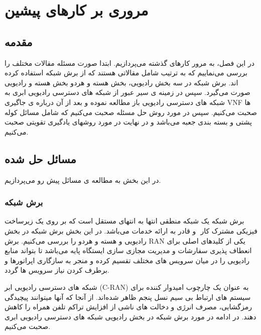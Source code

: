 \chapter{مروری بر کارهای پیشین}

\section{مقدمه}
در این فصل، به مرور کارهای گذشته می‌پردازیم.
ابتدا صورت مسئله مقالات مختلف را بررسی می‌نماییم که
 به ترتیب شامل مقالاتی هستند که از برش شبکه استفاده کرده اند.
برش شبکه در سه بخش رادیویی، بخش هسته و هردو بخش هسته و رادیویی صورت می‌گیرد.
سپس در زمینه ی سیر عبور از شبکه های دسترسی رادیویی ابری به شبکه های دسترسی رادیویی باز مطالعه نموده و بعد از آن درباره ی جاگیری VNF ها صحبت می‌کنیم.
سپس در مورد روش حل مسئله صحبت می‌کنیم که شامل مسائل کوله پشتی و بسته بندی جعبه می‌باشد و در نهایت در مورد روشهای یادگیری تقویتی صحبت می‌کنیم.
\section{مسائل حل شده}
در این بخش به مطالعه ی مسائل پیش رو می‌پردازیم. ‌‌‌
\subsection{برش شبکه}
برش شبکه یک شبکه منطقی انتها به انتهای مستقل است که بر روی یک زیرساخت فیزیکی مشترک کار ‌ و قادر به ارائه خدمات می‌باشد.
در این بخش برش شبکه در بخش رادیویی و هسته و هردو را بررسی می‌کنیم.
برش RAN یکی از کلیدهای اصلی برای انعطاف پذیری سفارشات و مدیریت مجازی سازی ایستگاه پایه می‌باشد تا بتواند منابع رادیویی را در میان سرویس های مختلف تقسیم کرده و منجر به سازگاری اپراتورها و برطرف کردن نیاز سرویس ها گردد.

شبکه های دسترسی رادیویی ابر (C-RAN) به عنوان یک چارچوب امیدوار کننده برای سیستم های ارتباط بی سیم نسل پنجم ظاهر شده‌اند.
از آنجا که آنها میتوانند پیچیدگی رمزگشایی، مصرف انرژی و دخالت های ناشی از افزایش تراکم تلفن همراه را کاهش دهند\cite{cranInt}.
در ادامه در مورد برش شبکه در بخش رادیویی شبکه های دسترسی رادیویی ابری صحبت می‌کنیم.

